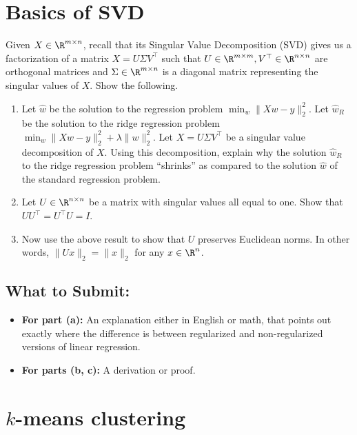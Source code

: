 \documentclass{article}
\begin{document}
\section*{Basics of SVD}
\begin{aprob}
  Given $X \in \R^{m \times n}$, recall that its Singular Value Decomposition (SVD) gives us a factorization of a matrix $X = U \Sigma V^\top$ such that $U \in \R^{m \times m}, V^\top \in \R^{n \times n}$ are orthogonal matrices and $\Sigma \in \R^{m \times n}$ is a diagonal matrix representing the singular values of $X$.
  Show the following.
  \begin{enumerate}
    \item {} Let $\widehat{w}$ be the solution to the regression problem $\min_{w} \|Xw - y\|_2^2$. Let $\widehat{w}_R$ be the solution to the ridge regression problem $\min_w \|X w - y\|_2^2 + \lambda \|w\|_2^2$. Let $X = U \Sigma V^\top$ be a singular value decomposition of $X$. Using this decomposition, explain why the solution $\widehat{w}_R$ to the ridge regression problem ``shrinks'' as compared to the solution $\widehat{w}$ of the standard regression problem. 
    \item {} Let $U \in \R^{n\times n}$ be a matrix with singular values all equal to one. Show that $UU^\top = U^\top U = I$.
    \item {} Now use the above result to show that $U$ preserves Euclidean norms. In other words, $\|U x\|_2 = \|x\|_2$ for any $x\in \R^n$.   
  \end{enumerate}
  
  \subsection*{What to Submit:}
    \begin{itemize}
        \item \textbf{For part (a):} An explanation either in English or math, that points out exactly where the difference is
between regularized and non-regularized versions of linear regression.
        \item \textbf{For parts (b, c):} A derivation or proof.
    \end{itemize}
  
\end{aprob}

\section*{$k$-means clustering}
\end{document}
